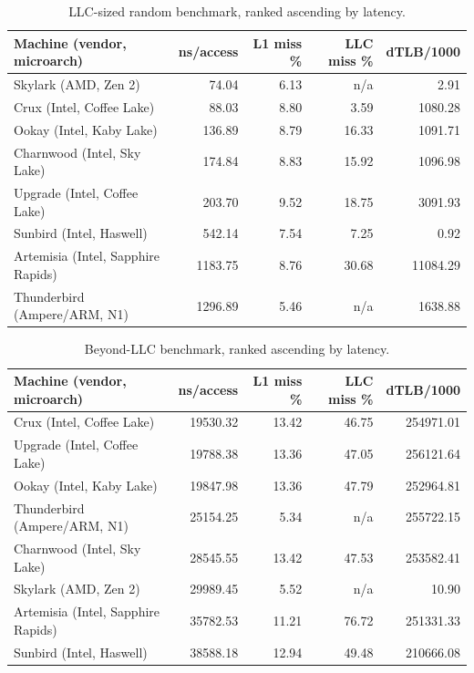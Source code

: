 \documentclass{article}
\begin{document}
\begin{table}[htbp]
\centering
\small
\begin{tabular}{@{} l r r r r @{}}
\toprule
Machine (vendor, microarch) & ns/access & L1 miss \% & LLC miss \% & dTLB/1000 \\
\midrule
Skylark (AMD, Zen 2) & 74.04 & 6.13 & n/a & 2.91 \\
Crux (Intel, Coffee Lake) & 88.03 & 8.80 & 3.59 & 1080.28 \\
Ookay (Intel, Kaby Lake) & 136.89 & 8.79 & 16.33 & 1091.71 \\
Charnwood (Intel, Sky Lake) & 174.84 & 8.83 & 15.92 & 1096.98 \\
Upgrade (Intel, Coffee Lake) & 203.70 & 9.52 & 18.75 & 3091.93 \\
Sunbird (Intel, Haswell) & 542.14 & 7.54 & 7.25 & 0.92 \\
Artemisia (Intel, Sapphire Rapids) & 1183.75 & 8.76 & 30.68 & 11084.29 \\
Thunderbird (Ampere/ARM, N1) & 1296.89 & 5.46 & n/a & 1638.88 \\
\bottomrule
\end{tabular}
\caption{LLC-sized random benchmark, ranked ascending by latency.}
\label{tab:llc_random}
\end{table}

\begin{table}[htbp]
\centering
\small
\begin{tabular}{@{} l r r r r @{}}
\toprule
Machine (vendor, microarch) & ns/access & L1 miss \% & LLC miss \% & dTLB/1000 \\
\midrule
Crux (Intel, Coffee Lake) & 19530.32 & 13.42 & 46.75 & 254971.01 \\
Upgrade (Intel, Coffee Lake) & 19788.38 & 13.36 & 47.05 & 256121.64 \\
Ookay (Intel, Kaby Lake) & 19847.98 & 13.36 & 47.79 & 252964.81 \\
Thunderbird (Ampere/ARM, N1) & 25154.25 & 5.34 & n/a & 255722.15 \\
Charnwood (Intel, Sky Lake) & 28545.55 & 13.42 & 47.53 & 253582.41 \\
Skylark (AMD, Zen 2) & 29989.45 & 5.52 & n/a & 10.90 \\
Artemisia (Intel, Sapphire Rapids) & 35782.53 & 11.21 & 76.72 & 251331.33 \\
Sunbird (Intel, Haswell) & 38588.18 & 12.94 & 49.48 & 210666.08 \\
\bottomrule
\end{tabular}
\caption{Beyond-LLC benchmark, ranked ascending by latency.}
\label{tab:beyond_llc}
\end{table}
\end{document}

